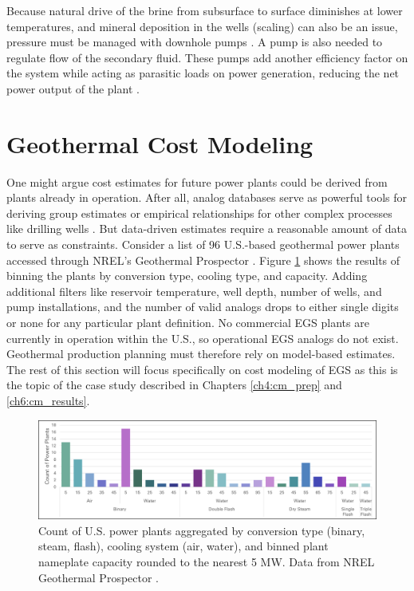 Because natural drive of the brine from subsurface to surface diminishes at lower temperatures, and mineral deposition in the wells (scaling) can also be an issue, pressure must be managed with downhole pumps \citep[p.\ 153]{dipippo_geothermal_2012}. A pump is also needed to regulate flow of the secondary fluid. These pumps add another efficiency factor on the system while acting as parasitic loads on power generation, reducing the net power output of the plant \citep[Figure 2,][]{lowry_implications_2017}.

\section{Geothermal Cost Modeling}\label{ch2:cost_models}
One might argue cost estimates for future power plants could be derived from plants already in operation. After all, analog databases serve as powerful tools for deriving group estimates or empirical relationships for other complex processes like drilling wells \citep{lukawski_cost_2014, tester_future_2006}. But data-driven estimates require a reasonable amount of data to serve as constraints. Consider a list of 96 U.S.-based geothermal power plants accessed through NREL’s Geothermal Prospector \citep{nrel_geothermal_2021}. Figure \ref{fig:nrel_us_pplants} shows the results of binning the plants by conversion type, cooling type, and capacity. Adding additional filters like reservoir temperature, well depth, number of wells, and pump installations, and the number of valid analogs drops to either single digits or none for any particular plant definition. No commercial EGS plants are currently in operation within the U.S., so operational EGS analogs do not exist. Geothermal production planning must therefore rely on model-based estimates. The rest of this section will focus specifically on cost modeling of EGS as this is the topic of the case study described in Chapters \ref{ch4:cm_prep} and \ref{ch6:cm_results}.

\begin{figure}
\centering
\includegraphics[width=.95\textwidth]{templates/images/Figure-NREL_US_PowerPlants.png}
\caption[Power plants in the United States]{Count of U.S. power plants aggregated by conversion type (binary, steam, flash), cooling system (air, water), and binned plant nameplate capacity rounded to the nearest 5 MW. Data from NREL Geothermal Prospector \protect\citep{nrel_geothermal_2021}.}
\label{fig:nrel_us_pplants}
\end{figure}

